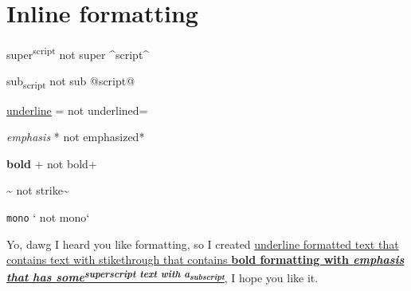 \section{\label{inline-formatting}Inline formatting}
\par super\textsuperscript{script} not super {\textasciicircum}script{\textasciicircum}
\par sub\textsubscript{script} not sub @script@
\par \ul{underline} = not underlined=
\par \emph{emphasis} * not emphasized*
\par \textbf{bold} + not bold+
\par {} {\textasciitilde} not strike{\textasciitilde}
\par \texttt{mono} ` not mono`
\par Yo, dawg I heard you like formatting, so I created \ul{underline formatted text that contains text with stikethrough that contains \textbf{bold formatting with \emph{emphasis that has some\textsuperscript{superscript text with a\textsubscript{subscript}}}}}, I hope you like it.
